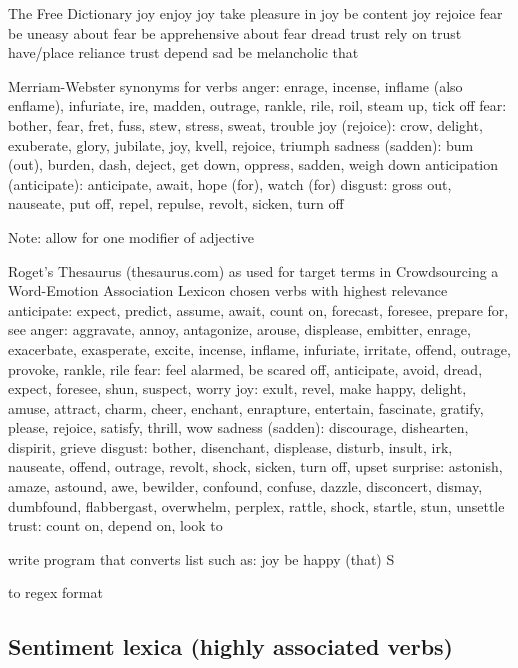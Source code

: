 The Free Dictionary
joy	enjoy
joy	take pleasure in
joy	be content
joy	rejoice
fear	be uneasy about
fear	be apprehensive about
fear	dread
trust	rely on
trust	have/place reliance
trust	depend
sad	be melancholic that


Merriam-Webster
synonyms for verbs
anger: enrage, incense, inflame (also enflame), infuriate, ire, madden, outrage, rankle, rile, roil, steam up, tick off
fear: bother, fear, fret, fuss, stew, stress, sweat, trouble
joy (rejoice): crow, delight, exuberate, glory, jubilate, joy, kvell, rejoice, triumph
sadness (sadden): bum (out), burden, dash, deject, get down, oppress, sadden, weigh down
anticipation (anticipate): anticipate, await, hope (for), watch (for)
disgust: gross out, nauseate, put off, repel, repulse, revolt, sicken, turn off

Note: allow for one modifier of adjective


Roget's Thesaurus (thesaurus.com)
as used for target terms in Crowdsourcing a Word-Emotion Association Lexicon
chosen verbs with highest relevance
anticipate: expect, predict, assume, await, count on, forecast, foresee, prepare for, see
anger: aggravate, annoy, antagonize, arouse, displease, embitter, enrage, exacerbate, exasperate, excite, incense, inflame, infuriate, irritate, offend, outrage, provoke, rankle, rile
fear: feel alarmed, be scared off, anticipate, avoid, dread, expect, foresee, shun, suspect, worry
joy: exult, revel, make happy, delight, amuse, attract, charm, cheer, enchant, enrapture, entertain, fascinate, gratify, please, rejoice, satisfy, thrill, wow
sadness (sadden): discourage, dishearten, dispirit, grieve
disgust: bother, disenchant, displease, disturb, insult, irk, nauseate, offend, outrage, revolt, shock, sicken, turn off, upset
surprise: astonish, amaze, astound, awe, bewilder, confound, confuse, dazzle, disconcert, dismay, dumbfound, flabbergast, overwhelm, perplex, rattle, shock, startle, stun, unsettle
trust: count on, depend on, look to

write program that converts list such as:
joy	be happy (that) S

to regex format


\subsection{Sentiment lexica (highly associated verbs)}

